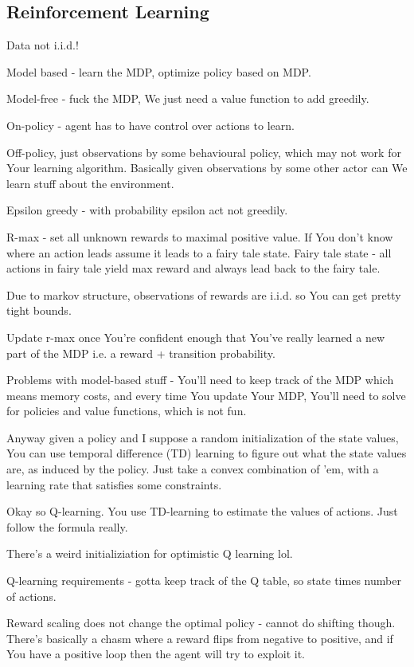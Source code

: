 \documentclass{article}
\begin{document}
	\subsection{Reinforcement Learning}
	
		Data not i.i.d.!
		
		Model based - learn the MDP, optimize policy based on MDP.
		
		Model-free - fuck the MDP, We just need a value function to add greedily.
		
		On-policy - agent has to have control over actions to learn.
		
		Off-policy, just observations by some behavioural policy, which may not work for Your learning algorithm. Basically given observations by some other actor can We learn stuff about the environment.
		
		Epsilon greedy - with probability epsilon act not greedily.
		
		R-max - set all unknown rewards to maximal positive value. If You don't know where an action leads assume it leads to a fairy tale state. Fairy tale state - all actions in fairy tale yield max reward and always lead back to the fairy tale.
		
		Due to markov structure, observations of rewards are i.i.d. so You can get pretty tight bounds.
		
		Update r-max once You're confident enough that You've really learned a new part of the MDP i.e. a reward + transition probability.
		
		Problems with model-based stuff - You'll need to keep track of the MDP which means memory costs, and every time You update Your MDP, You'll need to solve for policies and value functions, which is not fun.
		
		Anyway given a policy and I suppose a random initialization of the state values, You can use temporal difference (TD) learning to figure out what the state values are, as induced by the policy. Just take a convex combination of 'em, with a learning rate that satisfies some constraints.
		
		Okay so Q-learning. You use TD-learning to estimate the values of actions. Just follow the formula really.
		
		There's a weird initializiation for optimistic Q learning lol.
		
		Q-learning requirements - gotta keep track of the Q table, so state times number of actions.
		
		Reward scaling does not change the optimal policy - cannot do shifting though. There's basically a chasm where a reward flips from negative to positive, and if You have a positive loop then the agent will try to exploit it.
		
\end{document}
